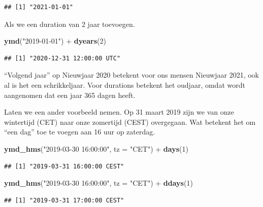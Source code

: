 \documentclass[]{tufte-book}
\newenvironment{Shaded}{}{}
\newcommand{\DataTypeTok}[1]{\textcolor[rgb]{0.56,0.13,0.00}{#1}}
\newcommand{\DecValTok}[1]{\textcolor[rgb]{0.25,0.63,0.44}{#1}}
\newcommand{\KeywordTok}[1]{\textcolor[rgb]{0.00,0.44,0.13}{\textbf{#1}}}
\newcommand{\NormalTok}[1]{#1}
\newcommand{\OperatorTok}[1]{\textcolor[rgb]{0.40,0.40,0.40}{#1}}
\newcommand{\StringTok}[1]{\textcolor[rgb]{0.25,0.44,0.63}{#1}}
\begin{document}
\begin{verbatim}
## [1] "2021-01-01"
\end{verbatim}

Als we een duration van 2 jaar toevoegen.

\begin{Shaded}
\begin{Highlighting}[]
\KeywordTok{ymd}\NormalTok{(}\StringTok{"2019-01-01"}\NormalTok{) }\OperatorTok{+}\StringTok{ }\KeywordTok{dyears}\NormalTok{(}\DecValTok{2}\NormalTok{)}
\end{Highlighting}
\end{Shaded}

\begin{verbatim}
## [1] "2020-12-31 12:00:00 UTC"
\end{verbatim}

``Volgend jaar'' op Nieuwjaar 2020 betekent voor ons mensen Nieuwjaar 2021, ook al is het een schrikkeljaar. Voor durations betekent het oudjaar, omdat wordt aangenomen dat een jaar 365 dagen heeft.

Laten we een ander voorbeeld nemen. Op 31 maart 2019 zijn we van onze wintertijd (CET) naar onze zomertijd (CEST) overgegaan. Wat betekent het om ``een dag'' toe te voegen aan 16 uur op zaterdag.

\begin{Shaded}
\begin{Highlighting}[]
\KeywordTok{ymd_hms}\NormalTok{(}\StringTok{"2019-03-30 16:00:00"}\NormalTok{, }\DataTypeTok{tz =} \StringTok{"CET"}\NormalTok{) }\OperatorTok{+}\StringTok{ }\KeywordTok{days}\NormalTok{(}\DecValTok{1}\NormalTok{)}
\end{Highlighting}
\end{Shaded}

\begin{verbatim}
## [1] "2019-03-31 16:00:00 CEST"
\end{verbatim}

\begin{Shaded}
\begin{Highlighting}[]
\KeywordTok{ymd_hms}\NormalTok{(}\StringTok{"2019-03-30 16:00:00"}\NormalTok{, }\DataTypeTok{tz =} \StringTok{"CET"}\NormalTok{) }\OperatorTok{+}\StringTok{ }\KeywordTok{ddays}\NormalTok{(}\DecValTok{1}\NormalTok{)}
\end{Highlighting}
\end{Shaded}

\begin{verbatim}
## [1] "2019-03-31 17:00:00 CEST"
\end{verbatim}
\end{document}

